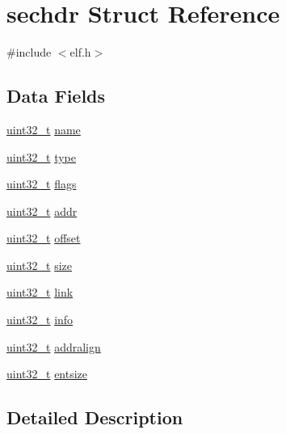 \hypertarget{structsechdr}{\section{sechdr \-Struct \-Reference}
\label{structsechdr}
}


{\ttfamily \#include $<$elf.\-h$>$}

\subsection*{\-Data \-Fields}
\begin{DoxyCompactItemize}
\item 
\hyperlink{types_8h_a435d1572bf3f880d55459d9805097f62}{uint32\-\_\-t} \hyperlink{structsechdr_a45bd257777c9fc7d036b6854755d8790}{name}
\item 
\hyperlink{types_8h_a435d1572bf3f880d55459d9805097f62}{uint32\-\_\-t} \hyperlink{structsechdr_acffd68b62e2e516fd537869d19041f01}{type}
\item 
\hyperlink{types_8h_a435d1572bf3f880d55459d9805097f62}{uint32\-\_\-t} \hyperlink{structsechdr_ad421a758659fa74ebff5f6ff3bca7a94}{flags}
\item 
\hyperlink{types_8h_a435d1572bf3f880d55459d9805097f62}{uint32\-\_\-t} \hyperlink{structsechdr_a01177bf70246483a03dd953d971e621d}{addr}
\item 
\hyperlink{types_8h_a435d1572bf3f880d55459d9805097f62}{uint32\-\_\-t} \hyperlink{structsechdr_aaae33ec54a7d3cb7e6c8138c4a716474}{offset}
\item 
\hyperlink{types_8h_a435d1572bf3f880d55459d9805097f62}{uint32\-\_\-t} \hyperlink{structsechdr_a309283bfb10685dfd97616963648fb96}{size}
\item 
\hyperlink{types_8h_a435d1572bf3f880d55459d9805097f62}{uint32\-\_\-t} \hyperlink{structsechdr_a23b277d435b5937eaad56740aa53a569}{link}
\item 
\hyperlink{types_8h_a435d1572bf3f880d55459d9805097f62}{uint32\-\_\-t} \hyperlink{structsechdr_ab42c2f90e8a62f87567a1b75836dcaa2}{info}
\item 
\hyperlink{types_8h_a435d1572bf3f880d55459d9805097f62}{uint32\-\_\-t} \hyperlink{structsechdr_acdef3f9bcf67524fb76a103170433b1f}{addralign}
\item 
\hyperlink{types_8h_a435d1572bf3f880d55459d9805097f62}{uint32\-\_\-t} \hyperlink{structsechdr_a68da29aef9f7b87f533b229abbaef452}{entsize}
\end{DoxyCompactItemize}


\subsection{\-Detailed \-Description}


